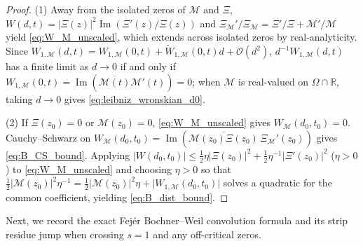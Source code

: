 \documentclass[11pt,reqno]{amsart}
\theoremstyle{definition}
\theoremstyle{remark}
\numberwithin{equation}{section}
\newcommand{\Ima}{\operatorname{Im}}
\begin{document}
\begin{proof}
(1) Away from the isolated zeros of $\mathcal{M}$ and $\Xi$, $W(d,t) = \lvert\Xi(z)\rvert^2\Ima(\Xi'(z)/\Xi(z))$ and $\Xi_{\mathcal{M}}'/\Xi_{\mathcal{M}} = \Xi'/\Xi + \mathcal{M}'/\mathcal{M}$ yield \eqref{eq:W_M_unscaled}, which extends across isolated zeros by real-analyticity. Since $W_{1,\mathcal{M}}(d,t) = W_{1,\mathcal{M}}(0,t) + \widetilde{W}_{1,\mathcal{M}}(0,t)d + \mathcal{O}(d^2)$, $d^{-1}W_{1,\mathcal{M}}(d,t)$ has a finite limit as $d \to 0$ if and only if $W_{1,\mathcal{M}}(0,t) = \Ima(\overline{\mathcal{M}(t)}\mathcal{M}'(t)) = 0$; when $\mathcal{M}$ is real-valued on $\Omega\cap\mathbb{R}$, taking $d \to 0$ gives \eqref{eq:leibniz_wronskian_d0}.

(2) If $\Xi(z_0) = 0$ or $\mathcal{M}(z_0) = 0$, \eqref{eq:W_M_unscaled} gives $W_{\mathcal{M}}(d_0,t_0) = 0$. Cauchy--Schwarz on $W_{\mathcal{M}}(d_0,t_0) = \Ima(\overline{\mathcal{M}(z_0)\Xi(z_0)}\,\Xi_{\mathcal{M}}'(z_0))$ gives \eqref{eq:B_CS_bound}. Applying $\lvert W(d_0,t_0)\rvert \le \frac{1}{2}\eta\lvert\Xi(z_0)\rvert^2 + \frac{1}{2}\eta^{-1}\lvert\Xi'(z_0)\rvert^2$ ($\eta > 0$) to \eqref{eq:W_M_unscaled} and choosing $\eta > 0$ so that $\frac{1}{2}\lvert\mathcal{M}(z_0)\rvert^2\eta^{-1} = \frac{1}{2}\lvert\mathcal{M}(z_0)\rvert^2\eta + \lvert W_{1,\mathcal{M}}(d_0,t_0)\rvert$ solves a quadratic for the common coefficient, yielding \eqref{eq:B_dist_bound}.
\end{proof}

Next, we record the exact Fej\'er Bochner--Weil convolution formula and its strip residue jump when crossing $s = 1$ and any off-critical zeros.
\end{document}
